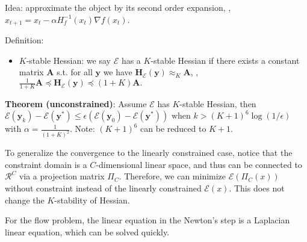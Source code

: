 Idea: approximate the object by its second order expansion, \ie, $x_{t+1} = x_t - \alpha H_f^{-1}(x_t) \nabla f(x_t)$.

Definition:
\begin{itemize}
    \item $K$-stable Hessian: we say $\mathcal{E}$ has a $K$-stable Hessian if there exists a constant matrix $\boldsymbol{A}$ s.t. for all $\boldsymbol{y}$ we have
    $
    \boldsymbol{H}_{\mathcal{E}}(\boldsymbol{y}) \approx_{K} \boldsymbol{A}$, \ie, $ \frac{1}{1+K} \boldsymbol{A} \preceq \boldsymbol{H}_{\mathcal{E}}(\boldsymbol{y}) \preceq(1+K) \boldsymbol{A} .
    $
\end{itemize}

\textbf{Theorem (unconstrained)}: Assume $\mathcal{E}$ has $K$-stable Hessian, then $\mathcal{E}\left(\boldsymbol{y}_{k}\right)-\mathcal{E}\left(\boldsymbol{y}^{*}\right) \leq \epsilon\left(\mathcal{E}\left(\boldsymbol{y}_{0}\right)-\mathcal{E}\left(\boldsymbol{y}^{*}\right)\right) \text { when } k>(K+1)^{6} \log (1 / \epsilon)$ with $\alpha = \frac{1}{(1+K)^2}$. Note: $(K+1)^6$ can be reduced to $K+1$.

To generalize the convergence to the linearly constrained case, notice that the constraint domain is a $C$-dimensional linear space, and thus can be connected to $\mathcal{R}^C$ via a projection matrix $\Pi_C$. Therefore, we can minimize $\mathcal{E}(\Pi_C(x))$ without constraint instead of the linearly constrained $\mathcal{E}(x)$. This does not change the $K$-stability of Hessian.

For the flow problem, the linear equation in the Newton's step is a Laplacian linear equation, which can be solved quickly.